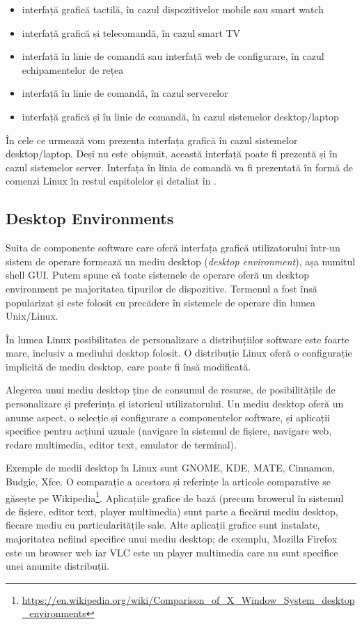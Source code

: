 \begin{itemize}
  \item interfață grafică tactilă, în cazul dispozitivelor mobile sau smart watch
  \item interfață grafică și telecomandă, în cazul smart TV
  \item interfață în linie de comandă sau interfață web de configurare, în cazul echipamentelor de rețea
  \item interfață în linie de comandă, în cazul serverelor
  \item interfață grafică și în linie de comandă, în cazul sistemelor desktop/laptop
\end{itemize}

În cele ce urmează vom prezenta interfața grafică în cazul sistemelor desktop/laptop. Deși nu este obișnuit, această interfață poate fi prezentă și în cazul sistemelor server. Interfața în linia de comandă va fi prezentată în formă de comenzi Linux în restul capitolelor și detaliat în .

\subsection{Desktop Environments}
\label{sec:ui:desktop-environments}

Suita de componente software care oferă interfața grafică utilizatorului într-un sistem de operare formează un mediu desktop (\textit{desktop environment}), așa numitul shell GUI. Putem spune că toate sistemele de operare oferă un desktop environment pe majoritatea tipurilor de dispozitive. Termenul a fost însă popularizat și este folosit cu precădere în sistemele de operare din lumea Unix/Linux.

În lumea Linux posibilitatea de personalizare a distribuțiilor software este foarte mare, inclusiv a mediului desktop folosit. O distribuție Linux oferă o configurație implicită de mediu desktop, care poate fi însă modificată.

Alegerea unui mediu desktop ține de consumul de resurse, de posibilitățile de personalizare și preferința și istoricul utilizatorului. Un mediu desktop oferă un anume aspect, o selecție și configurare a componentelor software, și aplicații specifice pentru acțiuni uzuale (navigare în sistemul de fișiere, navigare web, redare multimedia, editor text, emulator de terminal).

Exemple de medii desktop în Linux sunt GNOME, KDE, MATE, Cinnamon, Budgie, Xfce. O comparație a acestora și referințe la articole comparative se găsește pe Wikipedia\footnote{\url{https://en.wikipedia.org/wiki/Comparison\_of\_X\_Window\_System\_desktop\_environments}}. Aplicațiile grafice de bază (precum browerul în sistemul de fișiere, editor text, player multimedia) sunt parte a fiecărui mediu desktop, fiecare mediu cu particularitățile sale. Alte aplicații grafice sunt instalate, majoritatea nefiind specifice unui mediu desktop; de exemplu, Mozilla Firefox este un browser web iar VLC este un player multimedia care nu sunt specifice unei anumite distribuții.

